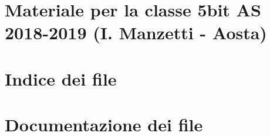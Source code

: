 \let\mypdfximage\pdfximage\def\pdfximage{\immediate\mypdfximage}\documentclass[twoside]{book}
\newcommand{\+}{\discretionary{\mbox{\scriptsize$\hookleftarrow$}}{}{}}
\newcommand{\clearemptydoublepage}{%
  \newpage{\pagestyle{empty}\cleardoublepage}%
}
\begin{document}
\chapter{Materiale per la classe 5bit AS 2018-\/2019 (I. Manzetti -\/ Aosta)}
\label{md_README}

\chapter{Indice dei file}

\chapter{Documentazione dei file}




















\backmatter
\newpage
{}
\clearemptydoublepage
{}
\printindex
\end{document}
